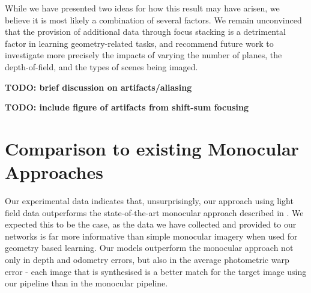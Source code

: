 While we have presented two ideas for how this result may have arisen, we believe it is most likely a combination of several factors. We remain unconvinced that the provision of additional data through focus stacking is a detrimental factor in learning geometry-related tasks, and recommend future work to investigate more precisely the impacts of varying the number of planes, the depth-of-field, and the types of scenes being imaged.

\textbf{TODO: brief discussion on artifacts/aliasing}

\textbf{TODO: include figure of artifacts from shift-sum focusing}

\section{Comparison to existing Monocular Approaches}

Our experimental data indicates that, unsurprisingly, our approach using light field data outperforms the state-of-the-art monocular approach described in \cite{zhou2017unsupervised}. We expected this to be the case, as the data we have collected and provided to our networks is far more informative than simple monocular imagery when used for geometry based learning. Our models outperform the monocular approach not only in depth and odometry errors, but also in the average photometric warp error - each image that is synthesised is a better match for the target image using our pipeline than in the monocular pipeline. 
